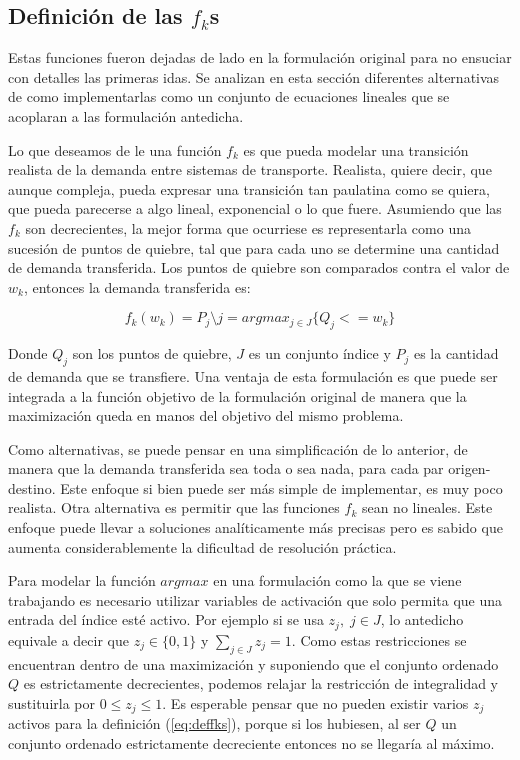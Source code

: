 \documentclass{article}
\begin{document}
  \subsection*{Definición de las $f_k$s}

  Estas funciones fueron dejadas de lado en la formulación original para no ensuciar con detalles las primeras idas. Se analizan en esta sección diferentes alternativas de como implementarlas como un conjunto de ecuaciones lineales que se acoplaran a las formulación antedicha.

  Lo que deseamos de le una función $f_k$ es que pueda modelar una transición realista de la demanda entre sistemas de transporte. Realista, quiere decir, que aunque compleja, pueda expresar una transición tan paulatina como se quiera, que pueda parecerse a algo lineal, exponencial o lo que fuere. Asumiendo que las $f_k$ son decrecientes, la mejor forma que ocurriese es representarla como una sucesión de puntos de quiebre, tal que para cada uno se determine una cantidad de demanda transferida. Los puntos de quiebre son comparados contra el valor de $w_k$, entonces la demanda transferida es:

  \begin{equation}
    \label{eq:deffks}
    f_k(w_k) = P_j \setminus j = argmax_{j \in J} \{Q_j <= w_k\}
  \end{equation}
  
  Donde $Q_j$ son los puntos de quiebre, $J$ es un conjunto índice y $P_j$ es la cantidad de demanda que se transfiere. Una ventaja de esta formulación es que puede ser integrada a la función objetivo de la formulación original de manera que la maximización queda en manos del objetivo del mismo problema.

  Como alternativas, se puede pensar en una simplificación de lo anterior, de manera que la demanda transferida sea toda o sea nada, para cada par origen-destino. Este enfoque si bien puede ser más simple de implementar, es muy poco realista. Otra alternativa es permitir que las funciones $f_k$ sean no lineales. Este enfoque puede llevar a soluciones analíticamente más precisas pero es sabido que aumenta considerablemente la dificultad de resolución práctica.

  Para modelar la función $argmax$ en una formulación como la que se viene trabajando es necesario utilizar variables de activación que solo permita que una entrada del índice esté activo. Por ejemplo si se usa $z_j,\; j \in J$, lo antedicho equivale a decir que $z_j \in \{0, 1\}$ y $\sum_{j \in J} z_j = 1$. Como estas restricciones se encuentran dentro de una maximización y suponiendo que el conjunto ordenado $Q$ es estrictamente decrecientes, podemos relajar la restricción de integralidad y sustituirla por $0 \leq z_j \leq 1$. Es esperable pensar que no pueden existir varios $z_j$ activos para la definición (\ref{eq:deffks}), porque si los hubiesen, al ser $Q$ un conjunto ordenado estrictamente decreciente entonces no se llegaría al máximo.
\end{document}
